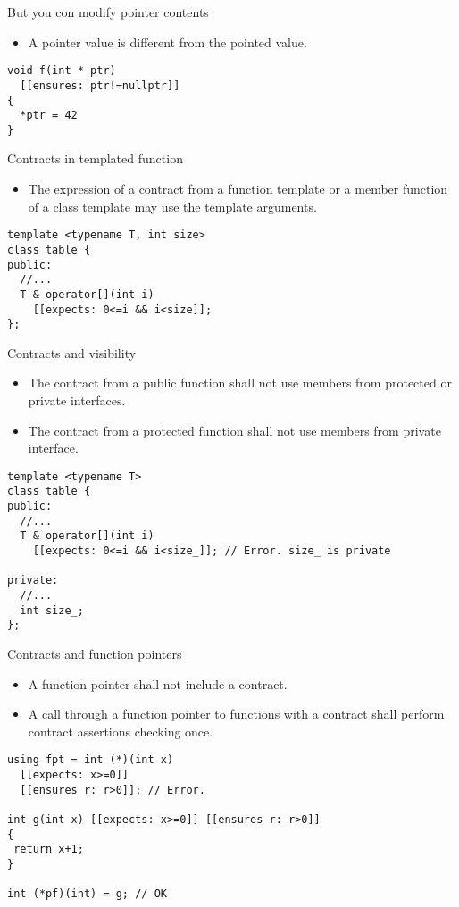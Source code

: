 \begin{frame}[t,fragile]{But you con modify pointer contents}
\begin{itemize}
  \item A pointer value is different from the pointed value.
\end{itemize}

\vfill\pause
\begin{lstlisting}
void f(int * ptr)
  [[ensures: ptr!=nullptr]]
{
  *ptr = 42
}
\end{lstlisting}
\end{frame}

\begin{frame}[t,fragile]{Contracts in templated function}
\begin{itemize}
  \item The expression of a contract from a function template
        or a member function of a class template may use the
        template arguments.
\end{itemize}

\vfill\pause
\begin{lstlisting}
template <typename T, int size>
class table {
public:
  //...
  T & operator[](int i)
    [[expects: 0<=i && i<size]];
};
\end{lstlisting}

\end{frame}

\begin{frame}[t,fragile]{Contracts and visibility}
\begin{itemize}
  \item The contract from a public function shall not use members from protected
or private interfaces.
  \item The contract from a protected function shall not use members from private 
interface.
\end{itemize}

\vfill\pause
\begin{lstlisting}
template <typename T>
class table {
public:
  //...
  T & operator[](int i)
    [[expects: 0<=i && i<size_]]; // Error. size_ is private

private:
  //...
  int size_;
};
\end{lstlisting}
\end{frame}

\begin{frame}[t,fragile]{Contracts and function pointers}
\begin{itemize}
  \item A function pointer shall not include a contract.
  \item A call through a function pointer to functions with
a contract shall perform contract assertions checking once.
\end{itemize}

\vfill\pause
\begin{lstlisting}
using fpt = int (*)(int x)
  [[expects: x>=0]]
  [[ensures r: r>0]]; // Error. 

int g(int x) [[expects: x>=0]] [[ensures r: r>0]]
{
 return x+1;
}

int (*pf)(int) = g; // OK
\end{lstlisting}
\end{frame}

